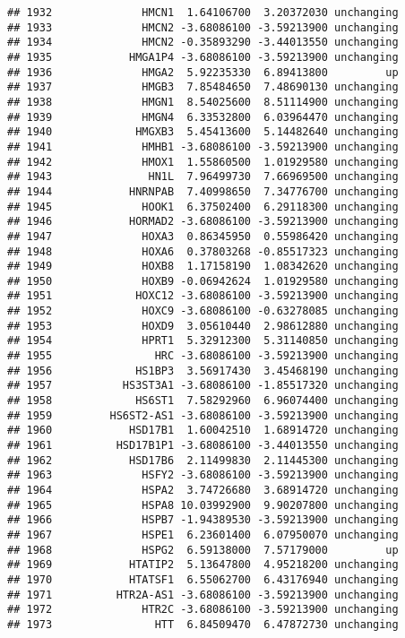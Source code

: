 \documentclass[]{article}
\begin{document}
\begin{verbatim}
## 1932              HMCN1  1.64106700  3.20372030 unchanging
## 1933              HMCN2 -3.68086100 -3.59213900 unchanging
## 1934              HMCN2 -0.35893290 -3.44013550 unchanging
## 1935            HMGA1P4 -3.68086100 -3.59213900 unchanging
## 1936              HMGA2  5.92235330  6.89413800         up
## 1937              HMGB3  7.85484650  7.48690130 unchanging
## 1938              HMGN1  8.54025600  8.51114900 unchanging
## 1939              HMGN4  6.33532800  6.03964470 unchanging
## 1940             HMGXB3  5.45413600  5.14482640 unchanging
## 1941              HMHB1 -3.68086100 -3.59213900 unchanging
## 1942              HMOX1  1.55860500  1.01929580 unchanging
## 1943               HN1L  7.96499730  7.66969500 unchanging
## 1944            HNRNPAB  7.40998650  7.34776700 unchanging
## 1945              HOOK1  6.37502400  6.29118300 unchanging
## 1946            HORMAD2 -3.68086100 -3.59213900 unchanging
## 1947              HOXA3  0.86345950  0.55986420 unchanging
## 1948              HOXA6  0.37803268 -0.85517323 unchanging
## 1949              HOXB8  1.17158190  1.08342620 unchanging
## 1950              HOXB9 -0.06942624  1.01929580 unchanging
## 1951             HOXC12 -3.68086100 -3.59213900 unchanging
## 1952              HOXC9 -3.68086100 -0.63278085 unchanging
## 1953              HOXD9  3.05610440  2.98612880 unchanging
## 1954              HPRT1  5.32912300  5.31140850 unchanging
## 1955                HRC -3.68086100 -3.59213900 unchanging
## 1956             HS1BP3  3.56917430  3.45468190 unchanging
## 1957           HS3ST3A1 -3.68086100 -1.85517320 unchanging
## 1958             HS6ST1  7.58292960  6.96074400 unchanging
## 1959         HS6ST2-AS1 -3.68086100 -3.59213900 unchanging
## 1960            HSD17B1  1.60042510  1.68914720 unchanging
## 1961          HSD17B1P1 -3.68086100 -3.44013550 unchanging
## 1962            HSD17B6  2.11499830  2.11445300 unchanging
## 1963              HSFY2 -3.68086100 -3.59213900 unchanging
## 1964              HSPA2  3.74726680  3.68914720 unchanging
## 1965              HSPA8 10.03992900  9.90207800 unchanging
## 1966              HSPB7 -1.94389530 -3.59213900 unchanging
## 1967              HSPE1  6.23601400  6.07950070 unchanging
## 1968              HSPG2  6.59138000  7.57179000         up
## 1969            HTATIP2  5.13647800  4.95218200 unchanging
## 1970            HTATSF1  6.55062700  6.43176940 unchanging
## 1971          HTR2A-AS1 -3.68086100 -3.59213900 unchanging
## 1972              HTR2C -3.68086100 -3.59213900 unchanging
## 1973                HTT  6.84509470  6.47872730 unchanging

\end{verbatim}
\end{document}
